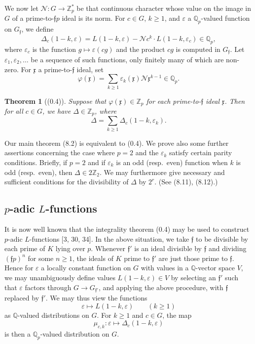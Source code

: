 \documentclass[12pt,a4paper]{article}
\theoremstyle{plain}
\newtheorem{theorem}{Theorem}[section]
\theoremstyle{definition}
\newcommand{\ff}{\mathfrak{f}}
\newcommand{\Z}{\mathbb{Z}}
\newcommand{\Q}{\mathbb{Q}}
\begin{document}
We now let $\mathcal{N}:G\to\Z_p^*$ be that continuous character whose value on the image in $G$ of a prime-to-$\ff p$ ideal is its norm. For $c\in G$, $k\ge1$, and $\varepsilon$ a $\Q_p$-valued function on $G_{\ff}$, we define
\[
\Delta_c(1-k,\varepsilon)=L(1-k,\varepsilon)-\mathcal{N}c^k\cdot L(1-k,\varepsilon_c)\in\Q_p,
\]
where $\varepsilon_c$ is the function $g\mapsto\varepsilon(cg)$ and the product $cg$ is computed in $G_{\ff}$. Let $\varepsilon_1,\varepsilon_2,\dots$ be a sequence of such functions, only finitely many of which are non-zero. For $\mathfrak{x}$ a prime-to-$\ff$ ideal, set
\[
\varphi(\mathfrak{x})=\sum_{k\ge1}\varepsilon_k(\mathfrak{x})\mathcal{N}\mathfrak{x}^{k-1}\in\Q_p.
\]

\begin{theorem}[(0.4)]
Suppose that $\varphi(\mathfrak{x})\in\Z_p$ for each prime-to-$\ff$ ideal $\mathfrak{x}$. Then for all $c\in G$, we have $\Delta\in\Z_p$, where
\[
\Delta=\sum_{k\ge1}\Delta_c(1-k,\varepsilon_k).
\]
\end{theorem}

Our main theorem (8.2) is equivalent to (0.4). We prove also some further assertions concerning the case where $p=2$ and the $\varepsilon_k$ satisfy certain parity conditions. Briefly, if $p=2$ and if $\varepsilon_k$ is an odd (resp.~even) function when $k$ is odd (resp.~even), then $\Delta\in2\Z_2$. We may furthermore give necessary and sufficient conditions for the divisibility of $\Delta$ by $2^r$. (See (8.11), (8.12).)

\subsection*{$p$-adic $L$-functions}

It is now well known that the integrality theorem (0.4) may be used to construct $p$-adic $L$-functions [3, 30, 34]. In the above situation, we take $\ff$ to be divisible by each prime of $K$ lying over $p$. Whenever $\ff'$ is an ideal divisible by $\ff$ and dividing $(\ff p)^n$ for some $n\ge1$, the ideals of $K$ prime to $\ff'$ are just those prime to $\ff$. Hence for $\varepsilon$ a locally constant function on $G$ with values in a $\Q$-vector space $V$, we may unambiguously define values $L(1-k,\varepsilon)\in V$ by selecting an $\ff'$ such that $\varepsilon$ factors through $G\to G_{\ff'}$, and applying the above procedure, with $\ff$ replaced by $\ff'$. We may thus view the functions
\[
\varepsilon\mapsto L(1-k,\varepsilon)\qquad(k\ge1)
\]
as $\Q$-valued distributions on $G$. For $k\ge1$ and $c\in G$, the map
\[
\mu_{c,k}:\varepsilon\mapsto\Delta_c(1-k,\varepsilon)
\]
is then a $\Q_p$-valued distribution on $G$.
\end{document}
